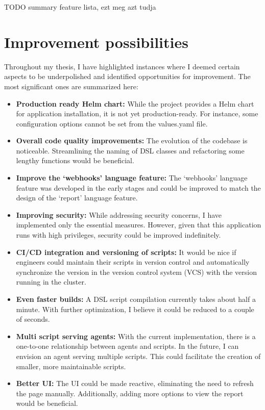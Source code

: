 TODO summary feature lista, ezt meg azt tudja

\section{Improvement possibilities}

Throughout my thesis, I have highlighted instances where I deemed certain aspects to be underpolished and identified opportunities for improvement. The most significant ones are summarized here:

\begin{itemize}
\item \textbf{Production ready Helm chart:} While the project provides a Helm chart for application installation, it is not yet production-ready. For instance, some configuration options cannot be set from the values.yaml file.

\item \textbf{Overall code quality improvements:} The evolution of the codebase is noticeable. Streamlining the naming of DSL classes and refactoring some lengthy functions would be beneficial.

\item \textbf{Improve the `webhooks' language feature:} The `webhooks' language feature was developed in the early stages and could be improved to match the design of the `report' language feature.

\item \textbf{Improving security:} While addressing security concerns, I have implemented only the essential measures. However, given that this application runs with high privileges, security could be improved indefinitely. 

\item \textbf{CI/CD integration and versioning of scripts:} It would be nice if engineers could maintain their scripts in version control and automatically synchronize the version in the version control system (VCS) with the version running in the cluster.

\item \textbf{Even faster builds:} A DSL script compilation currently takes about half a minute. With further optimization, I believe it could be reduced to a couple of seconds.

\item \textbf{Multi script serving agents:} With the current implementation, there is a one-to-one relationship between agents and scripts. In the future, I can envision an agent serving multiple scripts. This could facilitate the creation of smaller, more maintainable scripts.

\item \textbf{Better UI:} The UI could be made reactive, eliminating the need to refresh the page manually. Additionally, adding more options to view the report would be beneficial.
\end{itemize}
